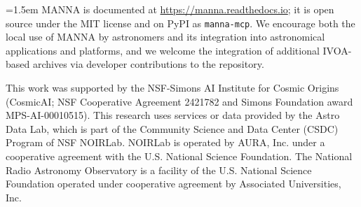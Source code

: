 \documentclass[11pt,twoside]{article}
\begin{document}
\emergencystretch=1.5em
MANNA is documented at \url{https://manna.readthedocs.io}; it is open source under the MIT license \citep{manna2026repo} and on PyPI as \texttt{manna-mcp}. We encourage both the local use of MANNA by astronomers and its integration into astronomical applications and platforms, and we welcome the integration of additional IVOA-based archives via developer contributions to the repository.
\par\emergencystretch=0pt

\acknowledgments This work was supported by the NSF-Simons AI Institute for Cosmic Origins (CosmicAI; NSF Cooperative Agreement 2421782 and Simons Foundation award MPS-AI-00010515). This research uses services or data provided by the Astro Data Lab, which is part of the Community Science and Data Center (CSDC) Program of NSF NOIRLab. NOIRLab is operated by AURA, Inc. under a cooperative agreement with the U.S. National Science Foundation. The National Radio Astronomy Observatory is a facility of the U.S. National Science Foundation operated under cooperative agreement by Associated Universities, Inc.


\end{document}

